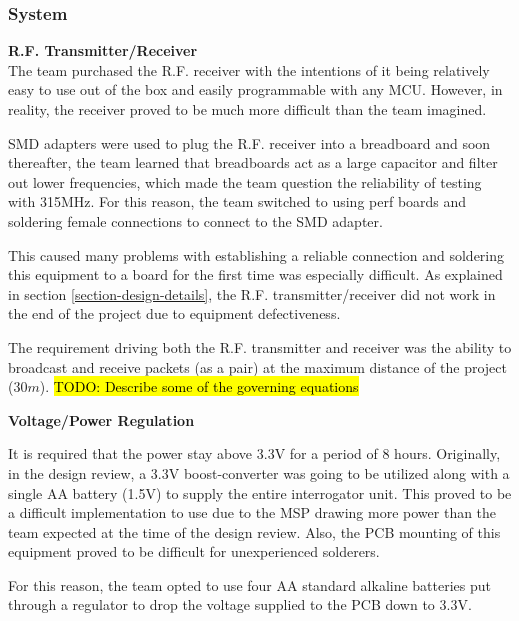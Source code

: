 \documentclass[letterpaper,10pt]{article}
\begin{document}
\begin{spacing}{1.15}
\subsubsection{System}

\hspace{5mm}\textbf{R.F. Transmitter/Receiver} \label{section:rf-transmitter-design-procedure} \\
The team purchased the R.F. receiver with the intentions of it being relatively easy to use out of the box and easily programmable with any MCU. However, in reality, the receiver proved to be much more difficult than the team imagined. 

SMD adapters were used to plug the R.F. receiver into a breadboard and soon thereafter, the team learned that breadboards act as a large capacitor and filter out lower frequencies, which made the team question the reliability of testing with 315MHz. For this reason, the team switched to using perf boards and soldering female connections to connect to the SMD adapter. 

This caused many problems with establishing a reliable connection and soldering this equipment to a board for the first time was especially difficult. As explained in section \ref{section-design-details}, the R.F. transmitter/receiver did not work in the end of the project due to equipment defectiveness.

The requirement driving both the R.F. transmitter and receiver was the ability to broadcast and receive packets (as a pair) at the maximum distance of the project ($30m$). 
\hl{TODO: Describe some of the governing equations}

\hspace{5mm}\textbf{Voltage/Power Regulation} \label{section:interrogator-voltage-regulation-design-procedure}

It is required that the power stay above 3.3V for a period of 8 hours. Originally, in the design review, a 3.3V boost-converter was going to be utilized along with a single AA battery (1.5V) to supply the entire interrogator unit. This proved to be a difficult implementation to use due to the MSP drawing more power than the team expected at the time of the design review. Also, the PCB mounting of this equipment proved to be difficult for unexperienced solderers. 

For this reason, the team opted to use four AA standard alkaline batteries put through a regulator to drop the voltage supplied to the PCB down to 3.3V. 


\end{spacing}
\end{document}
